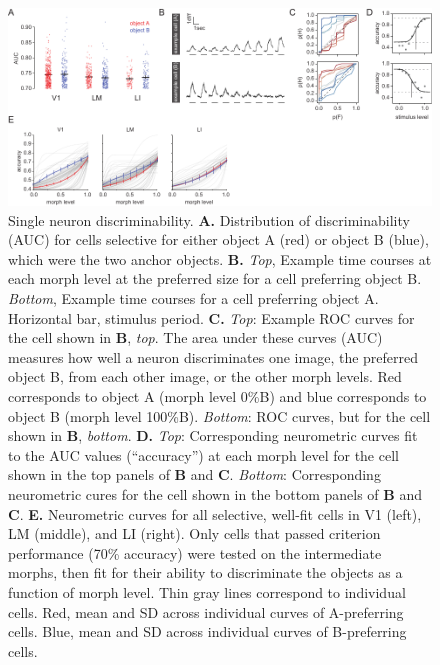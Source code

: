 \begin{figure}[hbt!]
    \includegraphics[width=\textwidth]{figures/chapter_4/fig_4-3_neurometric/fig_4-3_neurometric.pdf}
    \caption[Single neuron discriminability]{Single neuron discriminability. 
    \textbf{A.} Distribution of discriminability (AUC) for cells selective for either object A (red) or object B (blue), which were the two anchor objects.
    \textbf{B.} \textit{Top}, Example time courses at each morph level at the preferred size for a cell preferring object B. \textit{Bottom}, Example time courses for a cell preferring object A. Horizontal bar, stimulus period. 
    \textbf{C.} \textit{Top}: Example ROC curves for the cell shown in \textbf{B}, \textit{top}. The area under these curves (AUC) measures how well a neuron discriminates one image, the preferred object B, from each other image, or the other morph levels. Red corresponds to object A (morph level 0\%B) and blue corresponds to object B (morph level 100\%B). \textit{Bottom}: ROC curves, but for the cell shown in \textbf{B}, \textit{bottom}. 
    \textbf{D.} \textit{Top}: Corresponding neurometric curves fit to the AUC values (``accuracy'') at each morph level for the cell shown in the top panels of \textbf{B} and \textbf{C}. \textit{Bottom}: Corresponding neurometric cures for the cell shown in the bottom panels of \textbf{B} and \textbf{C}. 
    \textbf{E.} Neurometric curves for all selective, well-fit cells in V1 (left), LM (middle), and LI (right). Only cells that passed criterion performance (70\% accuracy) were tested on the intermediate morphs, then fit for their ability to discriminate the objects as a function of morph level. Thin gray lines correspond to individual cells. Red, mean and SD across individual curves of A-preferring cells. Blue, mean and SD across individual curves of B-preferring cells.
    \label{fig:neurometric}}
\end{figure}

